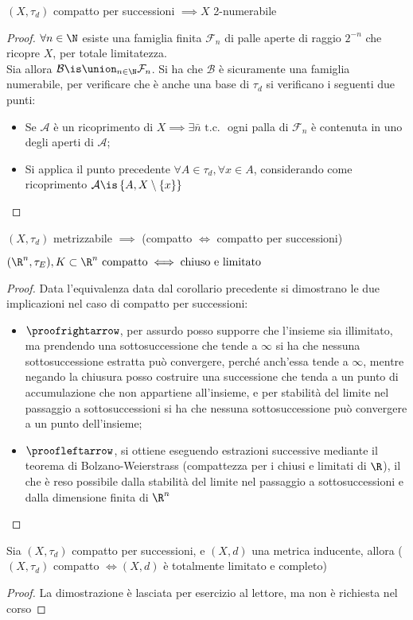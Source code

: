 \begin{prop}
$(X, \tau _d)$ compatto per successioni $\implies X$ 2-numerabile
\end{prop}
\begin{proof}
$\forall n \in \N$ esiste una famiglia finita $\mathcal{F}_n$ di palle aperte di raggio $2^{-n}$ che ricopre $X$, per totale limitatezza.\\
Sia allora $\mathcal{B} \is \union _{n \in \N} \mathcal F_n$. Si ha che $\mathcal{B}$ è sicuramente una famiglia numerabile, per verificare che è anche una base di $\tau _d$ si verificano i seguenti due punti:
\begin{itemize}
\item Se $\mathcal{A}$ è un ricoprimento di $X \implies \exists \bar{n} \text{ t.c. }$ ogni palla di $\mathcal{F}_n$ è contenuta in uno degli aperti di $\mathcal{A}$;
\item Si applica il punto precedente $\forall A \in \tau _d , \forall x \in A$, considerando come ricoprimento $\mathcal{A} \is \left\{ {A, X\setminus \left\{ {x}\right\}}\right\}$
\end{itemize}
\end{proof}

\begin{cor}
$(X,\tau _d)$ metrizzabile $\implies$ (compatto $\iff$ compatto per successioni)
\end{cor}

\begin{prop}
$(\R^n, \tau _E), K\subset \R^n\text{ compatto} \iff\text{chiuso e limitato}$
\end{prop}
\begin{proof}
Data l'equivalenza data dal corollario precedente si dimostrano le due implicazioni nel caso di compatto per successioni:
\begin{itemize}
\item $\proofrightarrow$, per assurdo posso supporre che l'insieme sia illimitato, ma prendendo una sottosuccessione che tende a $\infty$ si ha che nessuna sottosuccessione estratta può convergere, perché anch'essa tende a $\infty$, mentre negando la chiusura posso costruire una successione che tenda a un punto di accumulazione che non appartiene all'insieme, e per stabilità del limite nel passaggio a sottosuccessioni si ha che nessuna sottosuccessione può convergere a un punto dell'insieme;
\item $\proofleftarrow$, si ottiene eseguendo estrazioni successive mediante il teorema di Bolzano-Weierstrass (compattezza per i chiusi e limitati di $\R$), il che è reso possibile dalla stabilità del limite nel passaggio a sottosuccessioni e dalla dimensione finita di $\R^n$
\end{itemize}
\end{proof}

\begin{teo}
Sia $(X,\tau _d)$ compatto per successioni, e $(X,d)$ una metrica inducente, allora ($(X,\tau _d)$ compatto $\iff (X,d)$ è totalmente limitato e completo)
\end{teo}
\begin{proof}
La dimostrazione è lasciata per esercizio al lettore, ma non è richiesta nel corso
\end{proof}
